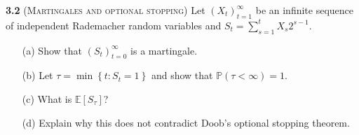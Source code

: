     
    
    
    
    
    
    
    
    

\noindent\textbf{3.2}
(\textsc{Martingales and optional stopping}) Let $\left(X_{t}\right)_{t=1}^{\infty}$ be an infinite sequence of independent
Rademacher random variables and $S_{t}=\sum_{s=1}^{t} X_{s} 2^{s-1}$.
\begin{enumerate}
    \item[(a)] Show that $\left(S_{t}\right)_{t=0}^{\infty}$ is a martingale.
    \item[(b)] Let $\tau=\min \left\{t: S_{t}=1\right\}$ and show that $\mathbb{P}(\tau<\infty)=1$. 
    \item[(c)] What is $\mathbb{E}\left[S_{\tau}\right]$?
    \item[(d)] Explain why this does not contradict Doob's optional stopping theorem. 
\end{enumerate}

